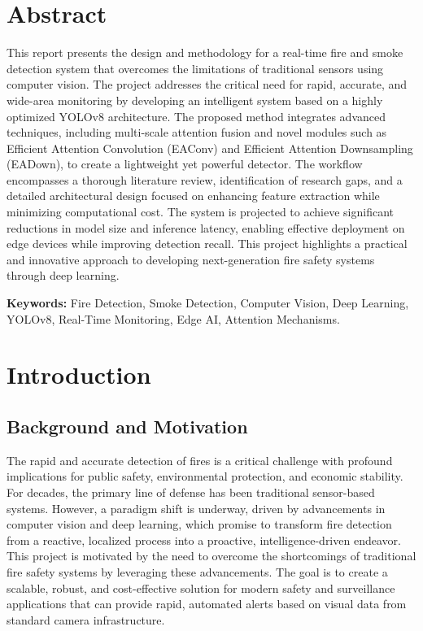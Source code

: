 \documentclass[12pt,a4paper]{article}
\begin{document}
\section*{Abstract}
This report presents the design and methodology for a real-time fire and smoke detection system that overcomes the limitations of traditional sensors using computer vision. The project addresses the critical need for rapid, accurate, and wide-area monitoring by developing an intelligent system based on a highly optimized YOLOv8 architecture. The proposed method integrates advanced techniques, including multi-scale attention fusion and novel modules such as Efficient Attention Convolution (EAConv) and Efficient Attention Downsampling (EADown), to create a lightweight yet powerful detector. The workflow encompasses a thorough literature review, identification of research gaps, and a detailed architectural design focused on enhancing feature extraction while minimizing computational cost. The system is projected to achieve significant reductions in model size and inference latency, enabling effective deployment on edge devices while improving detection recall. This project highlights a practical and innovative approach to developing next-generation fire safety systems through deep learning.

\textbf{Keywords:} Fire Detection, Smoke Detection, Computer Vision, Deep Learning, YOLOv8, Real-Time Monitoring, Edge AI, Attention Mechanisms.

\clearpage
\tableofcontents
\clearpage

\section{Introduction}
\subsection{Background and Motivation}
The rapid and accurate detection of fires is a critical challenge with profound implications for public safety, environmental protection, and economic stability. For decades, the primary line of defense has been traditional sensor-based systems. However, a paradigm shift is underway, driven by advancements in computer vision and deep learning, which promise to transform fire detection from a reactive, localized process into a proactive, intelligence-driven endeavor. This project is motivated by the need to overcome the shortcomings of traditional fire safety systems by leveraging these advancements. The goal is to create a scalable, robust, and cost-effective solution for modern safety and surveillance applications that can provide rapid, automated alerts based on visual data from standard camera infrastructure.
\end{document}
